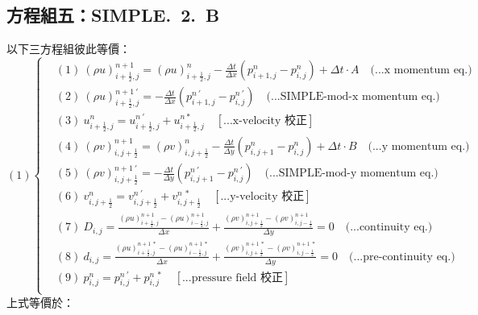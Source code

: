 \documentclass[12pt]{article}
\begin{document}
\subsection{方程組五：SIMPLE.\ 2.\ B}
\label{2.B.s}
\noindent 以下三方程組彼此等價：\\
\begin{equation}
(1)
\left\{
\begin{aligned}
    &(1)\ (\rho u)_{i+\frac{1}{2},j}^{n+1} = (\rho u)_{i+\frac{1}{2},j}^{n} - \frac{\Delta t}{\Delta x}(p_{i+1,j}^{n} - p_{i,j}^{n}) + \Delta t \cdot A  \quad \text{(...x momentum eq.)}\\[1.5ex]
    &(2)\ (\rho u)_{i+\frac{1}{2},j}^{n+1\ \prime} = - \frac{\Delta t}{\Delta x}(p_{i+1,j}^{n\ \prime} - p_{i,j}^{n\ \prime})  \quad \text{(...SIMPLE-mod-x momentum eq.)}\\[1.5ex]
    &(3)\ u_{i+\frac{1}{2},j}^{n} = u_{i+\frac{1}{2},j}^{n\ '} + u_{i+\frac{1}{2},j}^{n *}  \quad \left[\text{...x-velocity 校正}\right]\\[1.5ex]
    &(4)\ (\rho v)_{i,j+\frac{1}{2}}^{n+1} = (\rho v)_{i,j+\frac{1}{2}}^{n} - \frac{\Delta t}{\Delta y}(p_{i,j+1}^{n} - p_{i,j}^{n}) + \Delta t \cdot B  \quad \text{(...y momentum eq.)}\\[1.5ex]
    &(5)\ (\rho v)_{i,j+\frac{1}{2}}^{n+1\ \prime} =  - \frac{\Delta t}{\Delta y}(p_{i,j+1}^{n\ \prime} - p_{i,j}^{n\ \prime}) \quad \text{(...SIMPLE-mod-y momentum eq.)}\\[1.5ex]
    &(6)\ v_{i,j+\frac{1}{2}}^{n} = v_{i,j+\frac{1}{2}}^{n\ \prime} + v_{i,j+\frac{1}{2}}^{n\ *} \quad \left[\text{...y-velocity 校正}\right]\\[1.5ex]
    &(7)\ D_{i,j} = \frac{(\rho u)_{i+\frac{1}{2},j}^{n+1} - (\rho u)_{i-\frac{1}{2},j}^{n+1}}{\Delta x} + \frac{(\rho v)_{i,j+\frac{1}{2}}^{n+1} - (\rho v)_{i,j-\frac{1}{2}}^{n+1}}{\Delta y} = 0 \quad \text{(...continuity eq.)}\\[1.5ex]
    &(8)\ d_{i,j} = \frac{(\rho u)_{i+\frac{1}{2},j}^{n+1\ *} - (\rho u)_{i-\frac{1}{2},j}^{n+1\ *}}{\Delta x} + \frac{(\rho v)_{i,j+\frac{1}{2}}^{n+1\ *} - (\rho v)_{i,j-\frac{1}{2}}^{n+1\ *}}{\Delta y} = 0 \quad \text{(...pre-continuity eq.)}\\[1.5ex]
    &(9)\ p_{i,j}^{n} = p_{i,j}^{n\ \prime} + p_{i,j}^{n\ *} \quad\left[\text{...pressure field 校正}\right]\\[1.5ex]
\end{aligned}
\right.
\end{equation}
\noindent 上式等價於：\\
\end{document}
